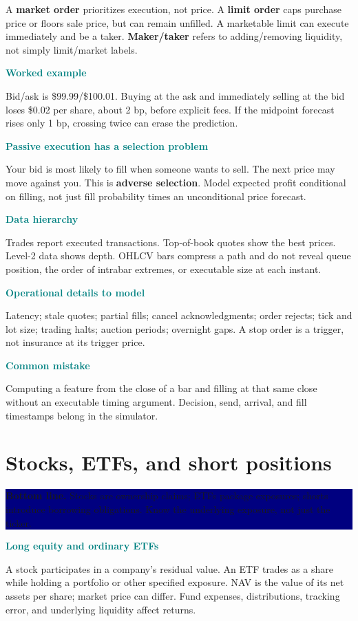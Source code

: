\documentclass[10pt,letterpaper]{article}
\newcommand{\bl}[1]{\noindent\colorbox{navy}{\parbox{\dimexpr\linewidth-2\fboxsep}{\color{white}\textbf{Bottom line.} #1}}\par\medskip}
\newcommand{\topic}[2]{\clearpage\section{#1}\bl{#2}}
\newcommand{\sub}[1]{\par\textbf{\textcolor{teal}{#1}}\par}
\newcommand{\ex}[1]{\sub{Worked example}#1}
\newcommand{\pit}[1]{\sub{Common mistake}#1}
\begin{document}
A \textbf{market order} prioritizes execution, not price. A \textbf{limit order} caps purchase price or floors sale price, but can remain unfilled. A marketable limit can execute immediately and be a taker. \textbf{Maker/taker} refers to adding/removing liquidity, not simply limit/market labels.
\ex{Bid/ask is \$99.99/\$100.01. Buying at the ask and immediately selling at the bid loses \$0.02 per share, about 2 bp, before explicit fees. If the midpoint forecast rises only 1 bp, crossing twice can erase the prediction.}
\sub{Passive execution has a selection problem}
Your bid is most likely to fill when someone wants to sell. The next price may move against you. This is \textbf{adverse selection}. Model expected profit conditional on filling, not just fill probability times an unconditional price forecast.
\sub{Data hierarchy}
Trades report executed transactions. Top-of-book quotes show the best prices. Level-2 data shows depth. OHLCV bars compress a path and do not reveal queue position, the order of intrabar extremes, or executable size at each instant.
\sub{Operational details to model}
Latency; stale quotes; partial fills; cancel acknowledgments; order rejects; tick and lot size; trading halts; auction periods; overnight gaps. A stop order is a trigger, not insurance at its trigger price.
\pit{Computing a feature from the close of a bar and filling at that same close without an executable timing argument. Decision, send, arrival, and fill timestamps belong in the simulator.}
\topic{Stocks, ETFs, and short positions}{Stocks are ownership claims; ETFs package exposures; shorts introduce borrowing obligations. Know the underlying exposure, not just the ticker.}
\sub{Long equity and ordinary ETFs}
A stock participates in a company's residual value. An ETF trades as a share while holding a portfolio or other specified exposure. NAV is the value of its net assets per share; market price can differ. Fund expenses, distributions, tracking error, and underlying liquidity affect returns.
\end{document}
